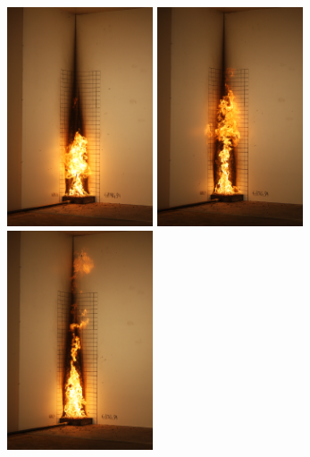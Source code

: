 \documentclass[twoside]{uocthesis}
\begin{document}
\begin{figure}[p]
	\includegraphics[width=1.7in]{../Figures/GBNG34_SequenceIMG_0993}
	\includegraphics[width=1.7in]{../Figures/GBNG34_SequenceIMG_0994} 
	\includegraphics[width=1.7in]{../Figures/GBNG34_SequenceIMG_0995} \\


\end{figure}
\end{document}
